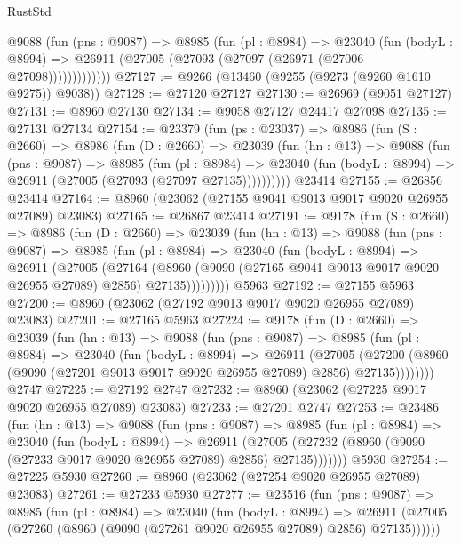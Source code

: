 \begin{lexlean}{RustStd}
\begin{coremodule}
            @9088
              (fun (pns : @9087) =>
              @8985
                (fun (pl : @8984) =>
                @23040
                  (fun (bodyL : @8994) =>
                  @26911 (@27005 (@27093 (@27097 (@26971 (@27006 @27098)))))))))))))
@27127 := @9266 (@13460 (@9255 (@9273 (@9260 @1610 @9275)) @9038))
@27128 := @27120 @27127
@27130 := @26969 (@9051 @27127)
@27131 := @8960 @27130
@27134 := @9058 @27127 @24417 @27098
@27135 := @27131 @27134
@27154 := @23379
    (fun (ps : @23037) =>
    @8986
      (fun (S : @2660) =>
      @8986
        (fun (D : @2660) =>
        @23039
          (fun (hn : @13) =>
          @9088
            (fun (pns : @9087) =>
            @8985
              (fun (pl : @8984) =>
              @23040 (fun (bodyL : @8994) => @26911 (@27005 (@27093 (@27097 @27135))))))))))
    @23414
@27155 := @26856 @23414
@27164 := @8960 (@23062 (@27155 @9041 @9013 @9017 @9020 @26955 @27089) @23083)
@27165 := @26867 @23414
@27191 := @9178
    (fun (S : @2660) =>
    @8986
      (fun (D : @2660) =>
      @23039
        (fun (hn : @13) =>
        @9088
          (fun (pns : @9087) =>
          @8985
            (fun (pl : @8984) =>
            @23040
              (fun (bodyL : @8994) =>
              @26911
                (@27005
                  (@27164
                    (@8960
                      (@9090 (@27165 @9041 @9013 @9017 @9020 @26955 @27089) @2856)
                      @27135)))))))))
    @5963
@27192 := @27155 @5963
@27200 := @8960 (@23062 (@27192 @9013 @9017 @9020 @26955 @27089) @23083)
@27201 := @27165 @5963
@27224 := @9178
    (fun (D : @2660) =>
    @23039
      (fun (hn : @13) =>
      @9088
        (fun (pns : @9087) =>
        @8985
          (fun (pl : @8984) =>
          @23040
            (fun (bodyL : @8994) =>
            @26911
              (@27005
                (@27200 (@8960 (@9090 (@27201 @9013 @9017 @9020 @26955 @27089) @2856) @27135))))))))
    @2747
@27225 := @27192 @2747
@27232 := @8960 (@23062 (@27225 @9017 @9020 @26955 @27089) @23083)
@27233 := @27201 @2747
@27253 := @23486
    (fun (hn : @13) =>
    @9088
      (fun (pns : @9087) =>
      @8985
        (fun (pl : @8984) =>
        @23040
          (fun (bodyL : @8994) =>
          @26911
            (@27005 (@27232 (@8960 (@9090 (@27233 @9017 @9020 @26955 @27089) @2856) @27135)))))))
    @5930
@27254 := @27225 @5930
@27260 := @8960 (@23062 (@27254 @9020 @26955 @27089) @23083)
@27261 := @27233 @5930
@27277 := @23516
    (fun (pns : @9087) =>
    @8985
      (fun (pl : @8984) =>
      @23040
        (fun (bodyL : @8994) =>
        @26911 (@27005 (@27260 (@8960 (@9090 (@27261 @9020 @26955 @27089) @2856) @27135))))))

\end{coremodule}
\end{lexlean}
